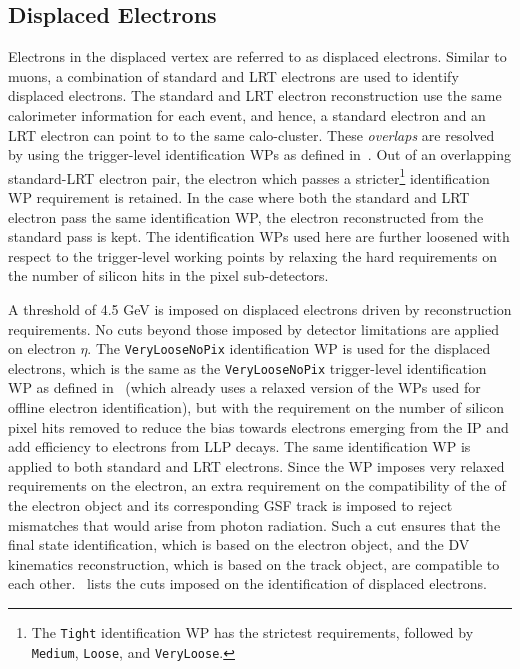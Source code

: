 \subsection{Displaced Electrons}
Electrons in the displaced vertex are referred to as displaced electrons. Similar to muons, a combination of standard and LRT electrons are used to identify displaced electrons. The standard and LRT electron reconstruction use the same calorimeter information for each event, and hence, a standard electron and an LRT electron can point to to the same calo-cluster. These \textit{overlaps} are resolved by using the trigger-level identification WPs as defined in~\cite{PERF-2017-01}. Out of an overlapping standard-LRT electron pair, the electron which passes a stricter\footnote{The \texttt{Tight} identification WP has the strictest requirements, followed by \texttt{Medium}, \texttt{Loose}, and \texttt{VeryLoose}.} identification WP requirement is retained. In the case where both the standard and LRT electron pass the same identification WP, the electron reconstructed from the standard pass is kept. The identification WPs used here are further loosened with respect to the trigger-level working points by relaxing the hard requirements on the number of silicon hits in the pixel sub-detectors. 

A \pT threshold of 4.5 GeV is imposed on displaced electrons driven by reconstruction requirements. No cuts beyond those imposed by detector limitations are applied on electron $\eta$. The \texttt{VeryLooseNoPix} identification WP is used for the displaced electrons, which is the same as the \texttt{VeryLooseNoPix} trigger-level identification WP as defined in~\cite{PERF-2017-01} (which already uses a relaxed version of the WPs used for offline electron identification), but with the requirement on the number of silicon pixel hits removed to reduce the bias towards electrons emerging from the IP and add efficiency to electrons from LLP decays. The same identification WP is applied to both standard and LRT electrons. Since the WP imposes very relaxed requirements on the electron, an extra requirement on the compatibility of the \pT of the electron object and its corresponding GSF track is imposed to reject mismatches that would arise from photon radiation. Such a cut ensures that the final state identification, which is based on the electron object, and the DV kinematics reconstruction, which is based on the track object, are compatible to each other.~ lists the cuts imposed on the identification of displaced electrons.

